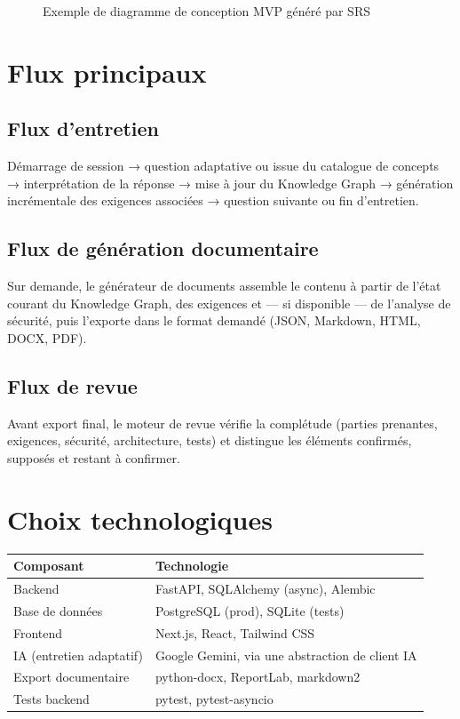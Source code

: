 \begin{figure}[h]
    \centering
    \caption{Exemple de diagramme de conception MVP généré par SRS}
\end{figure}

\section{Flux principaux}
\subsection{Flux d'entretien}
Démarrage de session → question adaptative ou issue du catalogue de concepts →
interprétation de la réponse → mise à jour du Knowledge Graph → génération incrémentale
des exigences associées → question suivante ou fin d'entretien.

\subsection{Flux de génération documentaire}
Sur demande, le générateur de documents assemble le contenu à partir de l'état courant
du Knowledge Graph, des exigences et — si disponible — de l'analyse de sécurité, puis
l'exporte dans le format demandé (JSON, Markdown, HTML, DOCX, PDF).

\subsection{Flux de revue}
Avant export final, le moteur de revue vérifie la complétude (parties prenantes,
exigences, sécurité, architecture, tests) et distingue les éléments confirmés, supposés
et restant à confirmer.

\section{Choix technologiques}
\begin{longtable}{|l|l|}
\hline
\textbf{Composant} & \textbf{Technologie} \\
\hline
Backend & FastAPI, SQLAlchemy (async), Alembic \\
Base de données & PostgreSQL (prod), SQLite (tests) \\
Frontend & Next.js, React, Tailwind CSS \\
IA (entretien adaptatif) & Google Gemini, via une abstraction de client IA \\
Export documentaire & python-docx, ReportLab, markdown2 \\
Tests backend & pytest, pytest-asyncio \\
\hline
\end{longtable}
